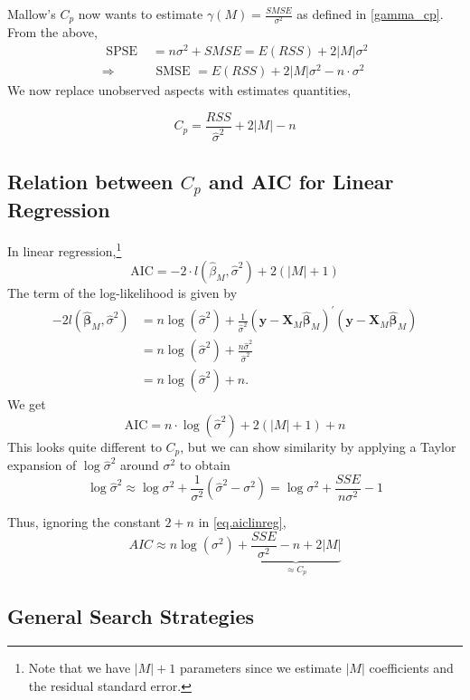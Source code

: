 \documentclass[11pt, %
	oneside, %
	english, %
	onehalfspacing, %
	]{article} %
\numberwithin{equation}{section}
\begin{document}
Mallow's $C_p$ now wants to estimate $\gamma (M) = \frac{SMSE}{\sigma^2}$ as defined in \eqref{gamma_cp}. From the above,
$$
\begin{aligned}
\text { SPSE }&=n \sigma^2+S M S E=E(R S S)+2|M| \sigma^2  \\
 \Rightarrow & \text{ SMSE }=E(R S S)+2|M| \sigma^2-n \cdot \sigma^2
\end{aligned}
$$
We now replace unobserved aspects with estimates quantities,

$$
C_p=\frac{R S S}{\hat{\sigma}^2}+2|M|-n
$$


\subsection{Relation between $C_p$ and AIC for Linear Regression}

In linear regression,\footnote{Note that we have $|M| + 1$ parameters since we estimate $|M|$ coefficients and the residual standard error.}
$$
\mathrm{AIC}=-2 \cdot l\left(\hat{\beta}_M, \hat{\sigma}^2\right)+2(|M|+1)
$$
The term of the log-likelihood is given by
$$
\begin{aligned}
-2 l\left(\hat{\mathbf{\beta}}_M, \hat{\sigma}^2\right) & =n \log \left(\hat{\sigma}^2\right)+\frac{1}{\hat{\sigma}^2}\left(\mathbf{y}-\mathbf{X}_M \hat{\mathbf{\beta}}_M\right)^{\prime}\left(\mathbf{y}-\mathbf{X}_M \hat{\mathbf{\beta}}_M\right) \\
& =n \log \left(\hat{\sigma}^2\right)+\frac{n \hat{\sigma}^2}{\hat{\sigma}^2} \\
& =n \log \left(\hat{\sigma}^2\right)+n.
\end{aligned}
$$
We get
\begin{equation}\label{eq.aiclinreg}
    \mathrm{AIC}=n \cdot \log \left(\hat{\sigma}^2\right)+2(|M|+1) + n
\end{equation}
This looks quite different to $C_p$, but we can show similarity by applying a Taylor expansion of $\log \hat{\sigma}^2$ around $\sigma^2$ to obtain
$$
\log \hat{\sigma}^2 \approx \log \sigma^2 + \frac{1}{\sigma^2} \left(\hat{\sigma}^2-\sigma^2\right) = \log \sigma^2 + \frac{SSE}{n \sigma^2} -1
$$

Thus, ignoring the constant $2+n$ in \eqref{eq.aiclinreg},
$$
AIC \approx n \log \left(\sigma^2\right)+\underbrace{ \frac{S S E}{\sigma^2}-n+2 \left| M \right|  }_{ \approx C_p }
$$



\subsection{General Search Strategies}
\end{document}
